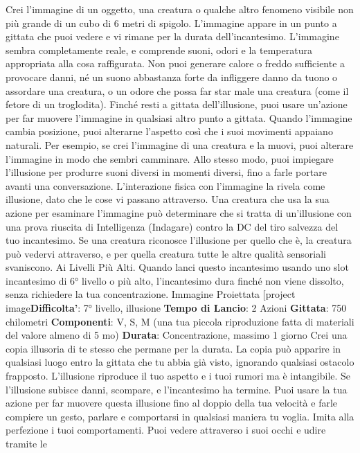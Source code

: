 \begin{multicols}{2}
Crei l’immagine di un oggetto, una creatura o qualche
altro fenomeno visibile non più grande di un cubo di 6
metri di spigolo. L’immagine appare in un punto a
gittata che puoi vedere e vi rimane per la durata
dell’incantesimo. L’immagine sembra completamente
reale, e comprende suoni, odori e la temperatura
appropriata alla cosa raffigurata. Non puoi generare
calore o freddo sufficiente a provocare danni, né un
suono abbastanza forte da infliggere danno da tuono o
assordare una creatura, o un odore che possa far star
male una creatura (come il fetore di un troglodita).
Finché resti a gittata dell’illusione, puoi usare un’azione
per far muovere l’immagine in qualsiasi altro punto a
gittata. Quando l’immagine cambia posizione, puoi
alterarne l’aspetto così che i suoi movimenti appaiano
naturali. Per esempio, se crei l’immagine di una
creatura e la muovi, puoi alterare l’immagine in modo
che sembri camminare. Allo stesso modo, puoi
impiegare l’illusione per produrre suoni diversi in
momenti diversi, fino a farle portare avanti una
conversazione.
L’interazione fisica con l’immagine la rivela come
illusione, dato che le cose vi passano attraverso. Una
creatura che usa la sua azione per esaminare
l’immagine può determinare che si tratta di un’illusione
con una prova riuscita di Intelligenza (Indagare) contro
la DC del tiro salvezza del tuo incantesimo. Se una
creatura riconosce l’illusione per quello che è, la
creatura può vedervi attraverso, e per quella creatura
tutte le altre qualità sensoriali svaniscono.
Ai Livelli Più Alti. Quando lanci questo incantesimo
usando uno slot incantesimo di 6° livello o più alto,
l’incantesimo dura finché non viene dissolto, senza
richiedere la tua concentrazione.
Immagine Proiettata
[project image\textbf{Difficolta'}:
7° livello, illusione
\textbf{Tempo di Lancio}: 2 Azioni
\textbf{Gittata}: 750 chilometri
\textbf{Componenti}: V, S, M (una tua piccola riproduzione
fatta di materiali del valore almeno di 5 mo)
\textbf{Durata}: Concentrazione, massimo 1 giorno
Crei una copia illusoria di te stesso che permane per la
durata. La copia può apparire in qualsiasi luogo entro la
gittata che tu abbia già visto, ignorando qualsiasi
ostacolo frapposto. L’illusione riproduce il tuo aspetto e
i tuoi rumori ma è intangibile. Se l’illusione subisce
danni, scompare, e l’incantesimo ha termine.
Puoi usare la tua azione per far muovere questa
illusione fino al doppio della tua velocità e farle
compiere un gesto, parlare e comportarsi in qualsiasi
maniera tu voglia. Imita alla perfezione i tuoi
comportamenti.
Puoi vedere attraverso i suoi occhi e udire tramite le

\end{multicols}
